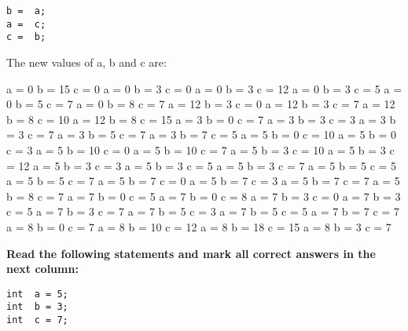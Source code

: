 \documentclass[10pt]{exam}
\begin{document}
\begin{questions}
\begin{minipage}[t][][t]{0.18\textwidth}
\begin{lstlisting}
b =  a;
a =  c;
c =  b;
  \end{lstlisting}
\end{minipage}
  \hfill
\begin{minipage}[t][][t]{0.75\textwidth}
  The new values of a, b and c are:
  \begin{multicols*}{3}
\begin{checkboxes}
    \choice a = 0 b = 15 c = 0
    \choice a = 0 b = 3 c = 0
    \choice a = 0 b = 3 c = 12
    \choice a = 0 b = 3 c = 5
    \choice a = 0 b = 5 c = 7
    \choice a = 0 b = 8 c = 7
    \choice a = 12 b = 3 c = 0
    \choice a = 12 b = 3 c = 7
    \choice a = 12 b = 8 c = 10
    \choice a = 12 b = 8 c = 15
    \choice a = 3 b = 0 c = 7
    \choice a = 3 b = 3 c = 3
    \choice a = 3 b = 3 c = 7
    \choice a = 3 b = 5 c = 7
    \choice a = 3 b = 7 c = 5
    \choice a = 5 b = 0 c = 10
    \choice a = 5 b = 0 c = 3
    \choice a = 5 b = 10 c = 0
    \choice a = 5 b = 10 c = 7
    \choice a = 5 b = 3 c = 10
    \choice a = 5 b = 3 c = 12
    \choice a = 5 b = 3 c = 3
    \choice a = 5 b = 3 c = 5
    \choice a = 5 b = 3 c = 7
    \choice a = 5 b = 5 c = 5
    \choice a = 5 b = 5 c = 7
    \choice a = 5 b = 7 c = 0
    \choice a = 5 b = 7 c = 3
    \choice a = 5 b = 7 c = 7
    \choice a = 5 b = 8 c = 7
    \choice a = 7 b = 0 c = 5
    \choice a = 7 b = 0 c = 8
    \choice a = 7 b = 3 c = 0
    \choice a = 7 b = 3 c = 5
    \choice a = 7 b = 3 c = 7
    \choice a = 7 b = 5 c = 3
    \choice a = 7 b = 5 c = 5
    \choice a = 7 b = 7 c = 7
    \choice a = 8 b = 0 c = 7
    \choice a = 8 b = 10 c = 12
    \choice a = 8 b = 18 c = 15
    \choice a = 8 b = 3 c = 7
  \end{checkboxes}
\end{multicols*}
\end{minipage}

\vspace{1cm}  \begin{minipage}[t][][t]{0.18\textwidth}
    \question \bf Read the following statements and mark all correct answers in the next column: \raggedright
  \begin{lstlisting}
int  a = 5;
int  b = 3;
int  c = 7;


\end{lstlisting}
\end{minipage}
\end{questions}
\end{document}

